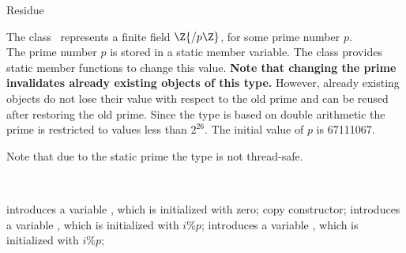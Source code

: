 \begin{ccRefClass} {Residue}
\label{Residue}

\def\ccTagOperatorLayout{\ccFalse}

\ccDefinition

The class \ccRefName\ represents a finite field $\Z{/p\Z}$, 
for some prime number $p$. \\

The prime number $p$ is stored in a static member variable. 
The class provides static member functions to change this value. 
{\bf Note that changing the prime invalidates already existing objects 
of this type.}
However, already existing objects do not lose their value with respect to the 
old prime and can be reused after restoring the old prime. 
Since the type is based on double 
arithmetic the prime is restricted to values less than $2^{26}$. 
The initial value of $p$ is 67111067. 

Note that due to the static prime the type is not thread-safe.


\ccIsModel
{}\\


\ccCreation
{}

{introduces a variable \ccVar, which is initialized with zero;}
\ccGlue
{}
{copy constructor;}
\ccGlue
{}
{introduces a variable \ccVar, which is initialized with $i \%  p$;}
\ccGlue
{}
{introduces a variable \ccVar, which is initialized with $i \%  p$;}

\ccOperations

\ccGlue
{}
\ccGlue
{}


\ccGlue
{}\ccGlue

\ccGlue
{}\ccGlue
{}\ccGlue
{}\ccGlue

\ccGlue
{}\ccGlue
{}\ccGlue
{}\ccGlue

\end{ccRefClass} 

